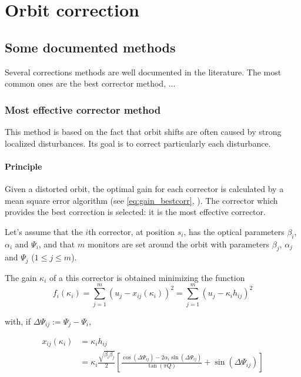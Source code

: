 
\chapter{Orbit correction}
\label{sec:correction}
\section{Some documented methods}

Several corrections methods are well documented in the literature. The most common ones are the best corrector method, ...

\subsection{Most effective corrector method}
This method is based on the fact that orbit shifts are often caused by strong localized disturbances. Its goal is to correct particularly each disturbance.

\subsubsection{Principle}

Given a distorted orbit, the optimal gain for each corrector is calculated by a mean square error algorithm (see \eqref{eq:gain_bestcorr}, \cite{book:wille}). The corrector which provides the best correction is selected: it is the most effective corrector.

Let's assume that the $i$th corrector, at position $s_i$, has the optical parameters $\beta_i$, $\alpha_i$ and $\Psi_i$, and that $m$ monitors are set around the orbit with parameters $\beta_j$, $\alpha_j$ and $\Psi_j$ ($1 \leq j \leq m$).

The gain $\kappa_i$ of a this corrector is obtained minimizing the function
\begin{equation}
    \label{eq:gain_bestcorr}
    f_i(\kappa_i) = \sum\limits_{j=1}^{m} (u_j-x_{ij}(\kappa_i))^2 
                  = \sum\limits_{j=1}^{m} (u_j- \kappa_i h_{ij})^2
\end{equation}

with, if $\Delta \Psi_{ij} := \Psi_j-\Psi_i$,

\begin{align}
    x_{ij}(\kappa_i) &= \kappa_i h_{ij} \nonumber\\
                     &= \kappa_i \frac{\sqrt{\beta_i \beta_j}}{2}
                         \left[
                             \frac{\cos(\Delta \Psi_{ij}) - 2\alpha_i \sin(\Delta\Psi_{ij})}
                                  {\tan (\pi Q)} + \sin (\Delta\Psi_{ij})
                         \right]
\end{align}

